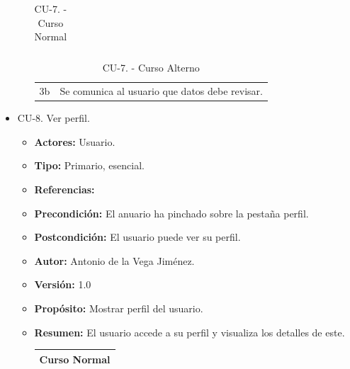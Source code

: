 \begin{itemize}
\begin{itemize}
\begin{table}[H]
\begin{tabularx}{\textwidth}{|l|X|l|X|}
      \end{tabularx}
      \caption{CU-7. - Curso Normal}
      \label{table-11}
    \end{table}
    \begin{table}[H]
      \centering
      \begin{tabularx}{\textwidth}{|l|X|}
       \hline
       \rowcolor[HTML]{C0C0C0} 
       \multicolumn{2}{|l|}{\cellcolor[HTML]{C0C0C0}Curso Alterno} \\ \hline
       \rowcolor[HTML]{FFFFFF} 
              3b                      & Se comunica al usuario que datos debe revisar.                            \\ \hline
      \end{tabularx}
      \caption{CU-7. - Curso Alterno}
      \label{table-12}
    \end{table}
  \end{itemize}
  \item CU-8. Ver perfil.
  \begin{itemize}
    \item \textbf{Actores:} Usuario.
    \item \textbf{Tipo:} Primario, esencial.
    \item \textbf{Referencias:}
    \item \textbf{Precondición:} El anuario ha pinchado sobre la pestaña perfil.
    \item \textbf{Postcondición:} El usuario puede ver su perfil.
    \item \textbf{Autor:} Antonio de la Vega Jiménez.
    \item \textbf{Versión:} 1.0
    \item \textbf{Propósito:} Mostrar perfil del usuario.
    \item \textbf{Resumen:} El usuario accede a su perfil y visualiza los detalles de este.
    \begin{table}[H]
      \centering
      \begin{tabularx}{\textwidth}{|l|X|l|X|}
        \hline
        \multicolumn{4}{|c|}{\cellcolor[HTML]{C0C0C0}Curso Normal}                                                 \\ \hline

\end{tabularx}
\end{table}
\end{itemize}
\end{itemize}
